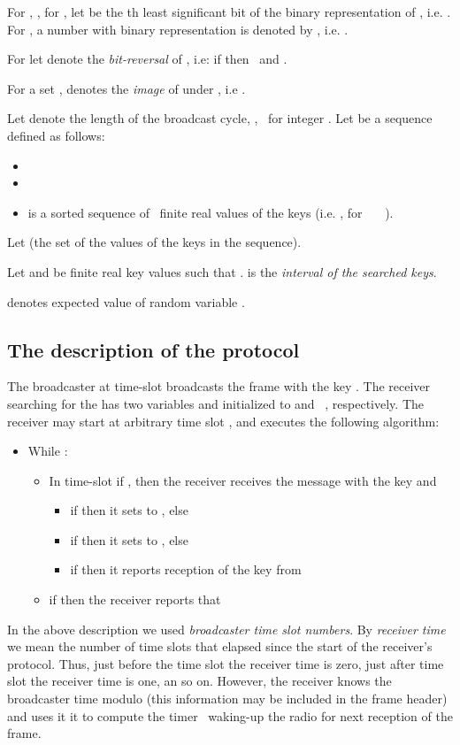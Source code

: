 \documentclass{article}
\newcommand{\tmem}[1]{{\em #1\/}}
\newenvironment{itemizedot}{\begin{itemize} \renewcommand{\labelitemi}{}\renewcommand{\labelitemii}{}\renewcommand{\labelitemiii}{}\renewcommand{\labelitemiv}{}}{\end{itemize}}
\begin{document}
For , , for , let  be
the th least significant bit of the binary representation of , i.e.
. For , a number with binary representation  is denoted by
, i.e. .

For  let  denote the {\em bit-reversal} of
, i.e: if  then  \ and .

For a set ,  denotes the
{\tmem{image}} of  under , i.e .

Let  denote the length of the broadcast cycle, , \ for integer . Let  be a
sequence defined as follows:
\begin{itemizedot}
  \item 
  
  \item 
  
  \item  is a sorted sequence of  \
  finite real values of the keys (i.e. , for \ \
  \ ).
\end{itemizedot}
Let  (the set of the
values of the keys in the sequence).

Let  and  be finite real key values such that .  is the {\em interval of the searched keys}.

 denotes expected value of random variable .

\subsection{The description of the protocol}

The broadcaster at time-slot  broadcasts the frame with the key
. The receiver searching for the
 has two variables  and 
initialized to  and \ , respectively. The receiver may start at
arbitrary time slot , and executes the following algorithm:
\begin{itemize}
\item While :
\begin{itemize}
  \item In time-slot  if , then the receiver receives the message with the key  and
  \begin{itemize}
    \item if  then it sets  to , else
    
    \item if  then it sets  to , else
    
    \item if  then it reports reception of 
     the key  from 
  \end{itemize}
  \item if  then the receiver reports that 
\end{itemize}
\end{itemize}
In the above description we used {\tmem{broadcaster time slot numbers}}. By
{\tmem{receiver time}} we mean the number of time slots that elapsed since
the start of the receiver's protocol. Thus, just before the time slot  the
receiver time is zero, just after time slot  the receiver time is one, an
so on. However, the receiver knows the broadcaster time modulo  (this
information may be included in the frame header) and uses it it to compute the
timer \ waking-up the radio for next reception of the frame.
\end{document}

